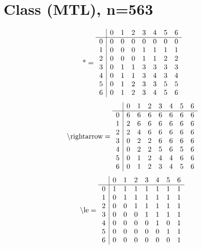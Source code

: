 \documentclass[11pt]{article}
\begin{document}
\section{Class (MTL), n=563}
\[\text{*} = 
\begin{array}{r | r r r r r r r}
 & 0 & 1 & 2 & 3 & 4 & 5 & 6 \\ \hline
0 & 0 & 0 & 0 & 0 & 0 & 0 & 0 \\
1 & 0 & 0 & 0 & 1 & 1 & 1 & 1 \\
2 & 0 & 0 & 0 & 1 & 1 & 2 & 2 \\
3 & 0 & 1 & 1 & 3 & 3 & 3 & 3 \\
4 & 0 & 1 & 1 & 3 & 4 & 3 & 4 \\
5 & 0 & 1 & 2 & 3 & 3 & 5 & 5 \\
6 & 0 & 1 & 2 & 3 & 4 & 5 & 6 \\
\end{array}
\]
\[\text{\textbackslash rightarrow} = 
\begin{array}{r | r r r r r r r}
 & 0 & 1 & 2 & 3 & 4 & 5 & 6 \\ \hline
0 & 6 & 6 & 6 & 6 & 6 & 6 & 6 \\
1 & 2 & 6 & 6 & 6 & 6 & 6 & 6 \\
2 & 2 & 4 & 6 & 6 & 6 & 6 & 6 \\
3 & 0 & 2 & 2 & 6 & 6 & 6 & 6 \\
4 & 0 & 2 & 2 & 5 & 6 & 5 & 6 \\
5 & 0 & 1 & 2 & 4 & 4 & 6 & 6 \\
6 & 0 & 1 & 2 & 3 & 4 & 5 & 6 \\
\end{array}
\]
\[\text{\textbackslash le} = 
\begin{array}{r | r r r r r r r}
 & 0 & 1 & 2 & 3 & 4 & 5 & 6 \\ \hline
0 & 1 & 1 & 1 & 1 & 1 & 1 & 1 \\
1 & 0 & 1 & 1 & 1 & 1 & 1 & 1 \\
2 & 0 & 0 & 1 & 1 & 1 & 1 & 1 \\
3 & 0 & 0 & 0 & 1 & 1 & 1 & 1 \\
4 & 0 & 0 & 0 & 0 & 1 & 0 & 1 \\
5 & 0 & 0 & 0 & 0 & 0 & 1 & 1 \\
6 & 0 & 0 & 0 & 0 & 0 & 0 & 1 \\
\end{array}
\]
\end{document}
